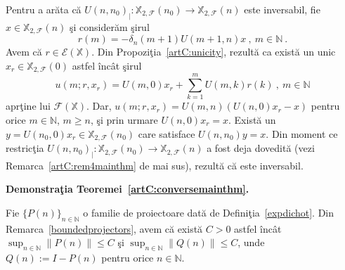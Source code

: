 \documentclass[ a4paper, 12pt]{report}
\newcommand{\E}{\mathcal{E}}
\newcommand{\F}{\mathcal{F}}
\newcommand{\N}{\mathbb{N}}
\newcommand{\X}{\mathbb{X}}
\theoremstyle{definition}
\theoremstyle{remark}
\numberwithin{equation}{section}
\begin{document}
Pentru a ar\u ata c\u a  $U(n,n_0)_{|}:\X_{2,\F}(n_0)\to\X_{2,\F}(n)$ este inversabil, fie $x\in\X_{2,\F}(n)$ \c si consider\u am \c sirul
$$r(m) = -\delta_{n}(m+1) U(m+1,n)x\ ,\ m\in\N\ .$$
Avem c\u a  $r\in\E(\X)$.
Din Propozi\c tia~\ref{artC:unicity}, rezult\u a ca exist\u a un unic $x_r\in\X_{2,\F}(0)$ astfel \^inc\^at \c sirul
$$u(m;r,x_r) = U(m,0)x_r +\sum_{k=1}^{m}U(m,k)r(k)\ ,\ m\in\N $$
apr\c tine lui $\F(\X)$.
Dar, $u(m;r,x_r) = U(m,n)(U(n,0)x_r-x)$ pentru orice $m\in\N$, $m\geq n$, \c si prin urmare $U(n,0)x_r = x$.
Exist\u a un  $y=U(n_0,0)x_r\in\X_{2,\F}(n_0)$
care satisface $U(n,n_0)y=x$.
Din moment ce restric\c tia  $U(n,n_0)_{|}:\X_{2,\F}(n_0)\to\X_{2,\F}(n)$ a fost deja dovedit\u a
(vezi Remarca~\ref{artC:rem4mainthm} de mai sus), rezult\u a c\u a este inversabil.

\bigskip


\noindent
\textbf{Demonstra\c tia Teoremei~\ref{artC:conversemainthm}.}
\medskip




















Fie $\{P(n)\}_{n\in\N}$ o familie de proiectoare dat\u a de Defini\c tia~\ref{expdichot}.
Din Remarca~\ref{boundedprojectors}, avem c\u a exist\u a $C>0$ astfel \^inc\^at $\sup_{n\in\N}\|P(n)\| \leq C$ \c si $\sup_{n\in\N}\|Q(n)\| \leq C$, unde
$Q(n):=I-P(n)$ pentru orice $n\in\N$.
\end{document}
